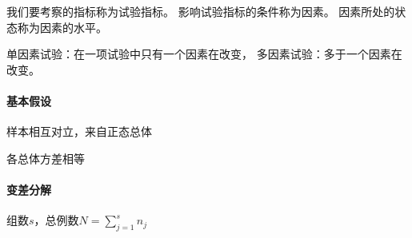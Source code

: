 我们要考察的指标称为试验指标。
影响试验指标的条件称为因素。
因素所处的状态称为因素的水平。

单因素试验：在一项试验中只有一个因素在改变，
多因素试验：多于一个因素在改变。

\paragraph{基本假设}
\begin{compactenum}
	\item 样本相互对立，来自正态总体
	\item 各总体方差相等
\end{compactenum}
\paragraph{变差分解}
组数$s$，总例数$N=\textstyle\sum_{j=1}^sn_j$

